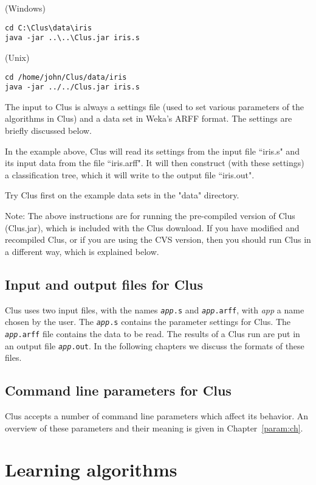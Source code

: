 (Windows)
\begin{verbatim}
cd C:\Clus\data\iris
java -jar ..\..\Clus.jar iris.s
\end{verbatim}

(Unix)
\begin{verbatim}
cd /home/john/Clus/data/iris
java -jar ../../Clus.jar iris.s
\end{verbatim}

The input to Clus is always a settings file (used to set various 
parameters of the algorithms in Clus) and a data set in Weka's 
ARFF format. The settings are briefly discussed below.

In the example above, Clus will read its settings from the input file 
``iris.s" and its input data from the file ``iris.arff". It will then construct 
(with these settings) a classification tree, which it will write to the 
output file ``iris.out".

Try Clus first on the example data sets in the "data" directory.

Note: The above instructions are for running the pre-compiled version 
of Clus (Clus.jar), which is included with the Clus download. If you have 
modified and recompiled Clus, or if you are using the CVS version, then
you should run Clus in a different way, which is explained below.

\section{Input and output files for Clus}

Clus uses two input files, with the names {\tt {\em app}.s} and {\tt {\em app}.arff}, with {\em app} a name chosen by the user.  The {\tt {\em app}.s} contains the parameter settings for Clus.  The {\tt {\em app}.arff} file contains the data to be read.  The results of a Clus run are put in an output file {\tt {\em app}.out}.  In the following chapters we discuss the formats of these files.

\section{Command line parameters for Clus}

Clus accepts a number of command line parameters which affect its behavior.  An overview of these parameters and their meaning is given in Chapter~\ref{param:ch}.

\chapter{Learning algorithms}

